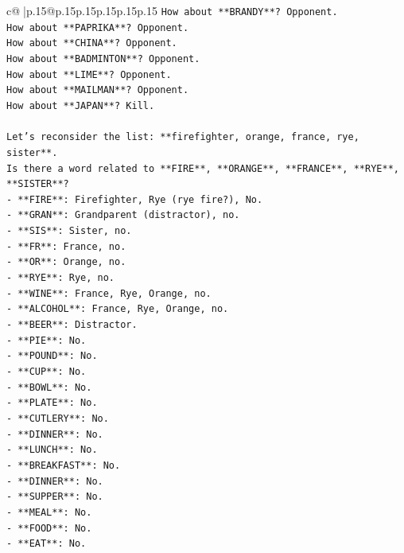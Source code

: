 \documentclass{article}
\begin{document}
{\begin{supertabular}{c@{$\;$}|p{.15\linewidth}@{}p{.15\linewidth}p{.15\linewidth}p{.15\linewidth}p{.15\linewidth}p{.15\linewidth}}
{{{\texttt{How about **BRANDY**? Opponent.} \\
\texttt{How about **PAPRIKA**? Opponent.} \\
\texttt{How about **CHINA**? Opponent.} \\
\texttt{How about **BADMINTON**? Opponent.} \\
\texttt{How about **LIME**? Opponent.} \\
\texttt{How about **MAILMAN**? Opponent.} \\
\texttt{How about **JAPAN**? Kill.} \\
\\ 
\texttt{Let's reconsider the list: **firefighter, orange, france, rye, sister**.} \\
\texttt{Is there a word related to **FIRE**, **ORANGE**, **FRANCE**, **RYE**, **SISTER**?} \\
\texttt{{-} **FIRE**: Firefighter, Rye (rye fire?), No.} \\
\texttt{{-} **GRAN**: Grandparent (distractor), no.} \\
\texttt{{-} **SIS**: Sister, no.} \\
\texttt{{-} **FR**: France, no.} \\
\texttt{{-} **OR**: Orange, no.} \\
\texttt{{-} **RYE**: Rye, no.} \\
\texttt{{-} **WINE**: France, Rye, Orange, no.} \\
\texttt{{-} **ALCOHOL**: France, Rye, Orange, no.} \\
\texttt{{-} **BEER**: Distractor.} \\
\texttt{{-} **PIE**: No.} \\
\texttt{{-} **POUND**: No.} \\
\texttt{{-} **CUP**: No.} \\
\texttt{{-} **BOWL**: No.} \\
\texttt{{-} **PLATE**: No.} \\
\texttt{{-} **CUTLERY**: No.} \\
\texttt{{-} **DINNER**: No.} \\
\texttt{{-} **LUNCH**: No.} \\
\texttt{{-} **BREAKFAST**: No.} \\
\texttt{{-} **DINNER**: No.} \\
\texttt{{-} **SUPPER**: No.} \\
\texttt{{-} **MEAL**: No.} \\
\texttt{{-} **FOOD**: No.} \\
\texttt{{-} **EAT**: No.} \\
}}}
\end{supertabular}}
\end{document}

